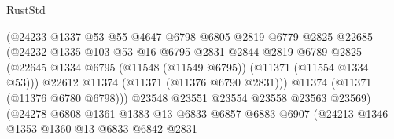 \begin{lexlean}{RustStd}
\begin{coremodule}
                                      (@24233
                                        @1337
                                        @53
                                        @55
                                        @4647
                                        @6798
                                        @6805
                                        @2819
                                        @6779
                                        @2825
                                        @22685
                                        (@24232
                                          @1335
                                          @103
                                          @53
                                          @16
                                          @6795
                                          @2831
                                          @2844
                                          @2819
                                          @6789
                                          @2825
                                          (@22645
                                            @1334
                                            @6795
                                            (@11548 (@11549 @6795))
                                            (@11371 (@11554 @1334 @53)))
                                          @22612
                                          @11374
                                          (@11371 (@11376 @6790 @2831)))
                                        @11374
                                        (@11371 (@11376 @6780 @6798)))
                                      @23548
                                      @23551
                                      @23554
                                      @23558
                                      @23563
                                      @23569)
                                    (@24278
                                      @6808
                                      @1361
                                      @1383
                                      @13
                                      @6833
                                      @6857
                                      @6883
                                      @6907
                                      (@24213
                                        @1346
                                        @1353
                                        @1360
                                        @13
                                        @6833
                                        @6842
                                        @2831

\end{coremodule}
\end{lexlean}
